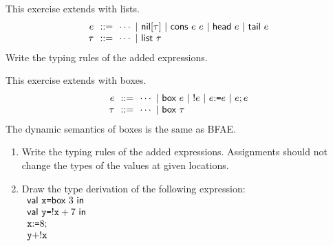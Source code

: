 \begin{exercise}

This exercise extends \Lang with lists.
  \[
    \begin{array}{r@{~~}r@{~~}l}
      e & ::= & \cdots
      \ |\ \textsf{nil}[\tau]
      \ |\ \textsf{cons}\ e\ e
      \ |\ \textsf{head}\ e
      \ |\ \textsf{tail}\ e \\
      \tau & ::= & \cdots\ |\ \textsf{list}\ \tau \\
    \end{array}
  \]
Write the typing rules of the added expressions.

\end{exercise}

\begin{exercise}

This exercise extends \Lang with boxes.
  \[
    \begin{array}{r@{~~}r@{~~}l}
      e & ::= & \cdots
      \ |\ \eref{e}
      \ |\ \ederef{e}
      \ |\ \eset{e}{e}
      \ |\ \eseq{e}{e} \\
      \tau & ::= & \cdots\ |\ \textsf{box}\ \tau \\
    \end{array}
  \]
      The dynamic semantics of boxes is the same as \textsf{BFAE}.
\begin{enumerate}
  \item Write the typing rules of the added expressions.
  Assignments should not change the types of the values at given locations.
  \item Draw the type derivation of the following expression:\\
  $
  \begin{array}{l}
    \ebind{\cx}{\eref{3}}{\\
    \ebind{\cy}{\ederef{\cx}+7}{\\
    \eseq{\eset{\cx}{8}}{\\
    \cy+\ederef{\cx}
    }}}
  \end{array}
  $
\end{enumerate}

\end{exercise}

